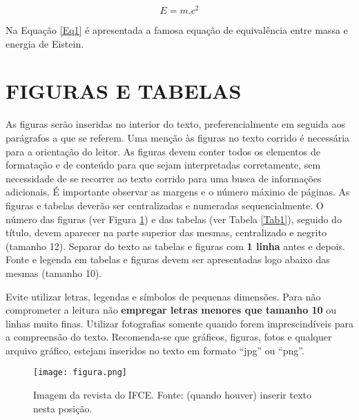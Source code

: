 \documentclass[10pt,brazil,english]{article}
\begin{document}
\begin{equation}
E=m.c^{2}
\label{Eq1}
\end{equation}

Na Equação \ref{Eq1} é apresentada a famosa equação de equivalência entre massa e energia de Eistein.

\section{\uppercase{Figuras e tabelas}}

As figuras serão inseridas no interior do texto, preferencialmente em seguida aos parágrafos a que se referem. Uma menção às figuras no texto corrido é necessária para a orientação do leitor. As figuras devem conter todos os elementos de formatação e de conteúdo para que sejam interpretadas corretamente, sem necessidade de se recorrer ao texto corrido para uma busca de informações adicionais. É importante observar as margens e o número máximo de páginas. As figuras e tabelas deverão ser centralizadas e numeradas sequencialmente. O número das figuras (ver Figura \ref{Fig1}) e das tabelas (ver Tabela \ref{Tab1}), seguido do título, devem aparecer na parte superior das mesmas, centralizado e negrito (tamanho 12). Separar do texto as tabelas e figuras com \textbf{1 linha} antes e depois. Fonte e legenda em tabelas e figuras devem ser apresentadas logo abaixo das mesmas (tamanho 10).

Evite utilizar letras, legendas e símbolos de pequenas dimensões. Para não comprometer a leitura não \textbf{empregar letras menores que tamanho 10} ou linhas muito finas. Utilizar fotografias somente quando forem imprescindíveis para a compreensão do texto. Recomenda-se que gráficos, figuras, fotos e qualquer arquivo gráfico, estejam inseridos no texto em formato ``jpg'' ou ``png''.


\begin{figure}[!hbtp]
\begin{center}

\texttt{[image: figura.png]}
\end{center}
\caption{Imagem da revista do IFCE. Fonte: (quando houver) inserir texto nesta posição.}
\label{Fig1}
\end{figure}
\end{document}
